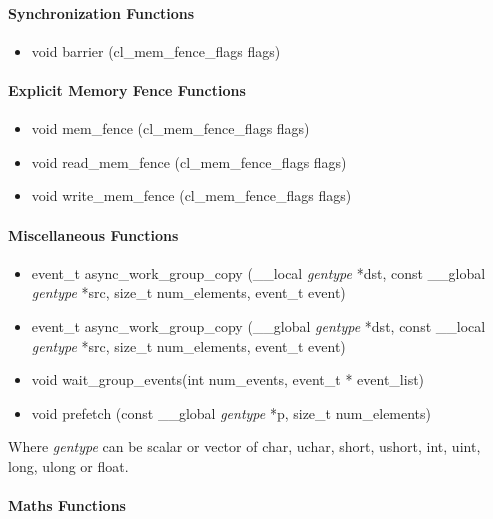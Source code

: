 				\paragraph{Synchronization Functions}
				
\begin{itemize}
	\item void barrier (cl\_mem\_fence\_flags flags)
\end{itemize}
			
				\paragraph{Explicit Memory Fence Functions}
				
\begin{itemize}
	\item void mem\_fence (cl\_mem\_fence\_flags flags)
	\item void read\_mem\_fence (cl\_mem\_fence\_flags flags)
	\item void write\_mem\_fence (cl\_mem\_fence\_flags flags)
\end{itemize}
			
				\paragraph{Miscellaneous Functions}
				
\begin{itemize}
	\item event\_t async\_work\_group\_copy (\_\_local \emph{gentype} *dst, const \_\_global \emph{gentype} *src, size\_t num\_elements, event\_t event)
	\item event\_t async\_work\_group\_copy (\_\_global \emph{gentype} *dst, const \_\_local \emph{gentype} *src, size\_t num\_elements, event\_t event)
	\item void wait\_group\_events(int num\_events, event\_t * event\_list)
	\item void prefetch (const \_\_global \emph{gentype} *p, size\_t num\_elements)
\end{itemize}
Where \emph{gentype} can be scalar or vector of char, uchar, short, ushort, int, uint, long, ulong or float.
				\paragraph{Maths Functions}

